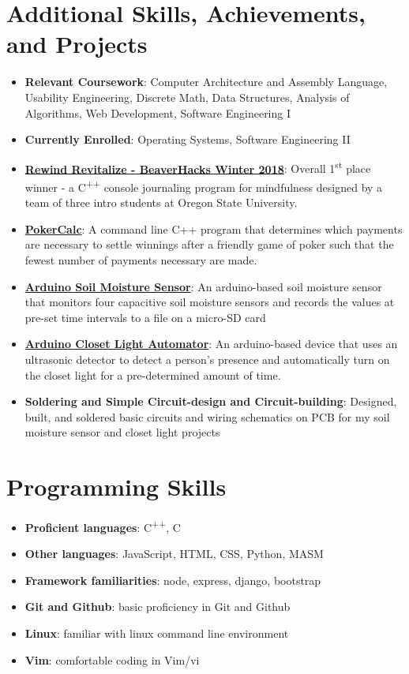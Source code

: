 \documentclass[letterpaper,11pt]{article}
\newcommand{\resumeItem}[2]{
  \item\small{
    \textbf{#1}{: #2 \vspace{-2pt}}
  }
}
\newcommand{\resumeSubItem}[2]{\resumeItem{#1}{#2}\vspace{-4pt}}
\newcommand{\resumeSubHeadingListStart}{\begin{itemize}[leftmargin=*]}
\newcommand{\resumeSubHeadingListEnd}{\end{itemize}}
\begin{document}
\section{Additional Skills, Achievements, and Projects}
  \resumeSubHeadingListStart
    \resumeSubItem{Relevant Coursework}
      {Computer Architecture and Assembly Language, Usability Engineering, Discrete Math, Data Structures, Analysis of Algorithms, Web Development, Software Engineering I}
    \resumeSubItem{Currently Enrolled}
    	{Operating Systems, Software Engineering II}
    \resumeSubItem{\href{https://github.com/jkbartos/rewind-revitalize}{Rewind Revitalize - BeaverHacks Winter 2018}}{Overall 1\textsuperscript{st} place winner - a C\textsuperscript{++} console journaling program for mindfulness designed by a team of three intro students at Oregon State University.}
    \resumeSubItem{\href{https://github.com/jordankbartos/PokerCalc}{PokerCalc}}
      {A command line C++ program that determines which payments are necessary to settle winnings after a friendly game of poker such that the fewest number of payments necessary are made.}
     \resumeSubItem{\href{https://www.github.com/jordankbartos/soil-moisture-sensor}{Arduino Soil Moisture Sensor}}{An arduino-based soil moisture sensor that monitors four capacitive soil moisture sensors and records the values at pre-set time intervals to a file on a micro-SD card}
     \resumeSubItem{\href{}{Arduino Closet Light Automator}}{An arduino-based device that uses an ultrasonic detector to detect a person's presence and automatically turn on the closet light for a pre-determined amount of time.}
     \resumeSubItem{Soldering and Simple Circuit-design and Circuit-building}{Designed, built, and soldered basic circuits and wiring schematics on PCB for my soil moisture sensor and closet light projects}

    
  \resumeSubHeadingListEnd
\hfill

\section{Programming Skills}
  \resumeSubHeadingListStart
    \resumeSubItem{Proficient languages}{ C\textsuperscript{++}, C}
    \resumeSubItem{Other languages}{JavaScript, HTML, CSS, Python, MASM}
    \resumeSubItem{Framework familiarities}{node, express, django, bootstrap}
    \resumeSubItem{Git and Github}{basic proficiency in Git and Github}
    \resumeSubItem{Linux}{familiar with linux command line environment}
    \resumeSubItem{Vim}{comfortable coding in Vim/vi}
  \resumeSubHeadingListEnd
 \hfill
\end{document}
